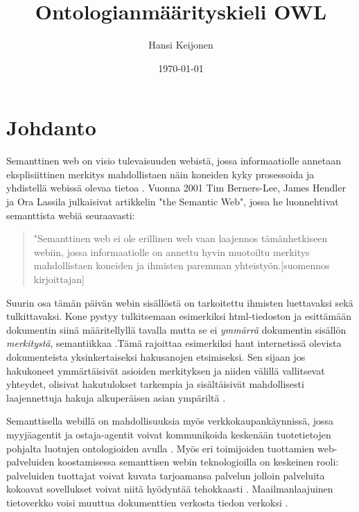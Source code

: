 \documentclass[finnish]{tktltiki2}
\title{Ontologianmäärityskieli OWL}
\author{Hansi Keijonen}
\date{\today}
\theoremstyle{definition}
\theoremstyle{remark}
\begin{document}

\maketitle        %
\makeabstract     %

\tableofcontents  %
\newpage          %



\section{Johdanto}
Semanttinen web on visio tulevaisuuden webistä, jossa informaatiolle annetaan eksplisiittinen
merkitys mahdollistaen näin koneiden kyky prosessoida ja yhdistellä webissä olevaa tietoa \cite{MH04}. 
Vuonna 2001 Tim Berners-Lee, James Hendler ja Ora Lassila julkaisivat artikkelin "the Semantic Web", jossa he
luonnehtivat semanttista webiä seuraavasti:
\begin{quote}
"Semanttinen web ei ole erillinen web vaan
laajennos tämänhetkiseen webiin, jossa informaatiolle on annettu hyvin muotoiltu
merkitys mahdollistaen koneiden ja ihmisten paremman yhteistyön.[suomennos kirjoittajan]
\end{quote}
Suurin osa tämän päivän webin sisällöstä on tarkoitettu ihmisten luettavaksi sekä tulkittavaksi.
Kone pystyy tulkitsemaan esimerkiksi html-tiedoston ja esittämään
dokumentin siinä määritellyllä tavalla mutta se ei
\textit{ymmärrä} dokumentin sisällön \textit{merkitystä}, semantiikkaa \cite{BHL01}.Tämä 
rajoittaa esimerkiksi haut internetissä olevista dokumenteista yksinkertaiseksi hakusanojen
etsimiseksi. Sen sijaan jos hakukoneet ymmärtäisivät asioiden merkityksen ja
niiden välillä vallitsevat yhteydet, olisivat hakutulokset tarkempia
ja sisältäisivät mahdollisesti laajennettuja hakuja alkuperäisen asian ympäriltä
\cite{SHIQ}. 

Semanttisella webillä on mahdollisuuksia myös verkkokaupankäynnissä, jossa 
myyjäagentit ja ostaja-agentit voivat kommunikoida keskenään tuotetietojen pohjalta luotujen 
ontologioiden avulla \cite{SHIQ}. Myös eri toimijoiden tuottamien web-palveluiden koostamisessa semanttisen 
webin teknologioilla on keskeinen rooli: palveluiden tuottajat voivat kuvata tarjoamansa
palvelun jolloin palveluita kokoavat sovellukset voivat niitä hyödyntää tehokkaasti \cite{SHIQ}. 
Maailmanlaajuinen tietoverkko voisi muuttua dokumenttien verkosta 
tiedon verkoksi \cite{BHL01}. 
\end{document}
